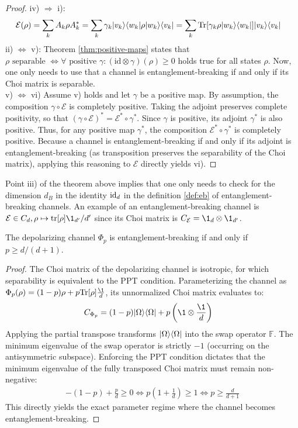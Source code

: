 \begin{proof}
iv) $\Rightarrow$ i):
\begin{align*}
    \mathcal{E}(\rho) &= \sum_k A_k \rho A_k^* = \sum_k \gamma_k \lvert v_k\rangle\langle w_k\rvert \rho \lvert w_k\rangle\langle v_k\rvert = \sum_k \text{Tr}[\gamma_k \rho \lvert w_k\rangle\langle w_k\rvert] \lvert v_k\rangle\langle v_k\rvert
\end{align*}
ii) $\Leftrightarrow$ v): Theorem \ref{thm:positive-maps} states that $\rho \text{ separable } \Leftrightarrow \forall \text{ positive } \gamma : (\text{id} \otimes \gamma)(\rho) \ge 0$ holds true for all states $\rho$. Now, one only needs to use that a channel is entanglement-breaking if and only if its Choi matrix is separable.\\
v) $\Leftrightarrow$ vi) 
Assume v) holds and let $\gamma$ be a positive map. By assumption, the composition $\gamma \circ \mathcal{E}$ is completely positive. Taking the adjoint preserves complete positivity, so that $
    (\gamma \circ \mathcal{E})^* = \mathcal{E}^* \circ \gamma^* $. Since $\gamma$ is positive, its adjoint $\gamma^*$ is also positive. Thus, for any positive map $\gamma^*$, the composition $\mathcal{E}^* \circ \gamma^*$ is completely positive. Because a channel is entanglement-breaking if and only if its adjoint is entanglement-breaking (as transposition preserves the separability of the Choi matrix), applying this reasoning to $\mathcal{E}$ directly yields vi).

\end{proof}
Point iii) of the theorem above implies that one only needs to check for the dimension $d_B$ in the identity $\mathrm{id}_d$ in the definition \ref{def:eb} of entanglement-breaking channels. An example of an entanglement-breaking channel is $\m E \in C_d, \rho \mapsto \trr{\rho}\1_{d'}/d'$ since its Choi matrix is $C_{\m E} = \1_d \otimes \1_{d'}$.
\begin{ex}\label{ex:depol-eb}
    The depolarizing channel $\Phi_p$ is entanglement-breaking if and only if $p\geq d/(d+1)$.
\end{ex}
\begin{proof}
The Choi matrix of the depolarizing channel is isotropic, for which separability is equivalent to the PPT condition. Parameterizing the channel as $\Phi_p(\rho) = (1-p)\rho + p \text{Tr}[\rho]\frac{\1}{d}$, its unnormalized Choi matrix evaluates to:
\begin{align*}
    C_{\Phi_p} &= (1-p)\ket{\Omega}\bra{\Omega} + p \left( \1 \otimes \frac{\1}{d} \right)
\end{align*}
Applying the partial transpose transforms $\lvert\Omega\rangle\langle\Omega\rvert$ into the swap operator $\mathbb{F}$. The minimum eigenvalue of the swap operator is strictly $-1$ (occurring on the antisymmetric subspace). Enforcing the PPT condition dictates that the minimum eigenvalue of the fully transposed Choi matrix must remain non-negative:
\begin{align*}
    -(1-p) + \frac{p}{d} \ge 0 \Leftrightarrow
    p \left(1 + \frac{1}{d}\right) \ge 1 \Leftrightarrow
    p \ge \frac{d}{d+1}
\end{align*}
This directly yields the exact parameter regime where the channel becomes entanglement-breaking.
\end{proof}

